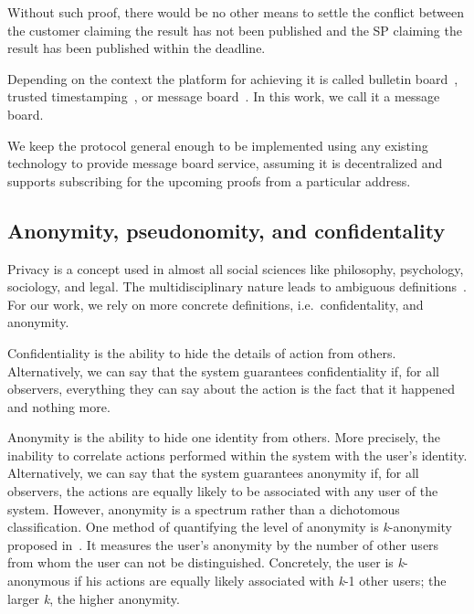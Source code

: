 \documentclass[pdftex,twocolumn,epjc3]{svjour3}
\begin{document}
{Without such proof, there would be no other means to settle the conflict between the customer claiming the result has not been published and the SP claiming the result has been published within the deadline.

Depending on the context the platform for achieving it is called bulletin board~\cite{achenbachImprovedCoercionresistantElectronic2015}, trusted timestamping~\cite{gippDecentralizedTrustedTimestamping2015}, or message board~\cite{hinarejosSolutionSecureCertified2019}. In this work, we call it a message board.

We keep the protocol general enough to be implemented using any existing technology to provide message board service, assuming it is decentralized and supports subscribing for the upcoming proofs from a particular address.

\subsection{Anonymity, pseudonomity, and confidentality}\label{sec:pseudo-anon}

Privacy is a concept used in almost all social sciences like philosophy, psychology, sociology, and legal. The multidisciplinary nature leads to ambiguous definitions~\cite{smithInformationPrivacyResearch2011}. For our work, we rely on more concrete definitions, i.e.~confidentality, and anonymity.

Confidentiality is the ability to hide the details of action from others. Alternatively, we can say that the system guarantees confidentiality if, for all observers, everything they can say about the action is the fact that it happened and nothing more.

Anonymity is the ability to hide one identity from others. More precisely, the inability to correlate actions performed within the system with the user's identity. Alternatively, we can say that the system guarantees anonymity if, for all observers, the actions are equally likely to be associated with any user of the system. However, anonymity is a spectrum rather than a dichotomous classification. One method of quantifying the level of anonymity is \textit{k}-anonymity proposed in~\cite{sweeneyKanonymityModelProtecting2002}. It measures the user's anonymity by the number of other users from whom the user can not be distinguished. Concretely, the user is \textit{k}-anonymous if his actions are equally likely associated with \textit{k}-1 other users; the larger \textit{k}, the higher anonymity.

}
\end{document}
